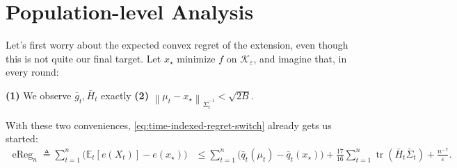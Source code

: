\documentclass{article}
\newcommand{\E}{\mathbb E}
\newcommand{\K}{\mathcal K}
\newcommand{\tr}{\operatorname{tr}}
\newcommand{\1}{\mathbf 1}
\newcommand{\eps}{\varepsilon}
\newcommand{\normm}[2]{\left\lVert #1\right\rVert_{#2}}
\begin{document}
\section{Population-level Analysis}
\label{sec:proof-sketch}
Let's first worry about the expected convex regret of the extension,
even though this is not quite our final target. Let $x_\star$ minimize
$f$ on $\K_\eps$, and imagine that, in every round:
\begin{center}
    \textcolor{blue!55!black}{\textbf{(1)}} We observe $\bar{g}_t,\bar{H}_t$ exactly
    \qquad
    \textcolor{blue!55!black}{\textbf{(2)}}
    $\normm{\mu_t-x_\star}{\bar{\Sigma}_t^{-1}}<\sqrt{2B}$.
\end{center}

With these two conveniences, \eqref{eq:time-indexed-regret-switch}
already gets us started:
\begin{align}
    \operatorname{eReg}_n \triangleq \sum_{t=1}^n\bigl(\E_t[e(X_t)]-e(x_\star)\bigr)
     & \leq\sum_{t=1}^n\bigl(\bar{q}_t(\mu_t)-\bar{q}_t(x_\star)\bigr)
    +\frac{17}{16}\sum_{t=1}^n\tr(\bar{H}_t\bar{\Sigma}_t)+\frac{n^{-7}}\eps.
\end{align}
\end{document}
